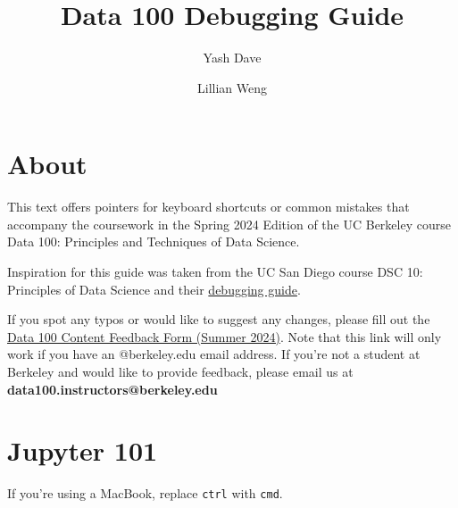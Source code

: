 \documentclass[
  letterpaper,
  DIV=11,
  numbers=noendperiod]{scrreprt}
\title{Data 100 Debugging Guide}
\author{Yash Dave \and Lillian Weng}
\date{}
\renewcommand*\contentsname{Table of contents}
\newcommand\contentsname{Table of contents}
\begin{document}
\maketitle

\renewcommand*\contentsname{Table of contents}
{
\hypersetup{linkcolor=}
\setcounter{tocdepth}{2}
\tableofcontents
}

\chapter*{About}\label{about}


This text offers pointers for keyboard shortcuts or common mistakes that
accompany the coursework in the Spring 2024 Edition of the UC Berkeley
course Data 100: Principles and Techniques of Data Science.

Inspiration for this guide was taken from the UC San Diego course DSC
10: Principles of Data Science and their
\href{https://dsc10.com/debugging/}{debugging guide}.

If you spot any typos or would like to suggest any changes, please fill
out the
\href{https://docs.google.com/forms/d/e/1FAIpQLSfDrb4YsIkKHMU6uVlO0zxbAbt5TRylpdmOLetfxxE6t-lI0w/viewform?usp=sf_link}{Data
100 Content Feedback Form (Summer 2024)}. Note that this link will only
work if you have an @berkeley.edu email address. If you're not a student
at Berkeley and would like to provide feedback, please email us at
\textbf{data100.instructors@berkeley.edu}


\chapter{Jupyter 101}\label{jupyter-101}

\begin{tcolorbox}[enhanced jigsaw, toprule=.15mm, colbacktitle=quarto-callout-note-color!10!white, coltitle=black, colframe=quarto-callout-note-color-frame, opacitybacktitle=0.6, breakable, colback=white, title=\textcolor{quarto-callout-note-color}{\faInfo}\hspace{0.5em}{Note}, arc=.35mm, titlerule=0mm, opacityback=0, left=2mm, toptitle=1mm, rightrule=.15mm, leftrule=.75mm, bottomrule=.15mm, bottomtitle=1mm]

If you're using a MacBook, replace \texttt{ctrl} with \texttt{cmd}.

\end{tcolorbox}
\end{document}
